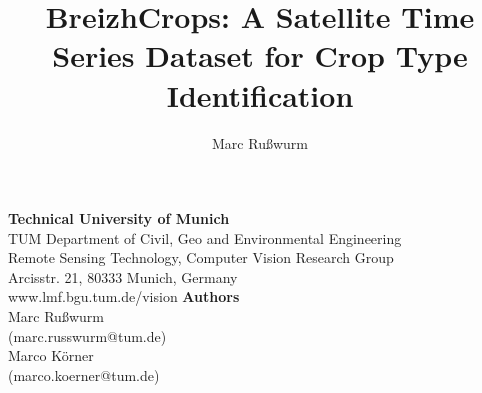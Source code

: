 \documentclass[a0]{tumposter}
\title{
	BreizhCrops: A Satellite Time Series Dataset for Crop Type Identification
	}
\author{
	Marc Rußwurm
	}
\begin{document}
\maketitle

\hfill

\begin{footer}
	\begin{multicols}{2}
		\textbf{Technical University of Munich}\\
		TUM Department of Civil, Geo and Environmental Engineering \\
		Remote Sensing Technology, Computer Vision Research Group \\
		Arcisstr. 21, 80333 Munich, Germany \\
		www.lmf.bgu.tum.de/vision
	\vfill\columnbreak
		\textbf{Authors} \\
		Marc Rußwurm \\ (marc.russwurm@tum.de) \\
		Marco Körner \\ (marco.koerner@tum.de)
	\vfill
	\end{multicols}
\end{footer}
\end{document}
